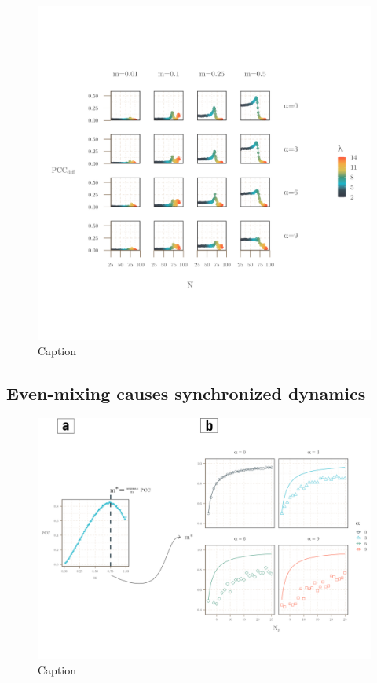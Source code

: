 \documentclass[]{article}
\begin{document}
\begin{figure}[H]
    \centering
    \includegraphics[width=15cm]{figs/abundance_v_alpha.png}
    \caption{Caption}
    \label{fig:mig_grad}
\end{figure}


\subsection{Even-mixing causes synchronized dynamics}


\begin{figure}[H]
    \centering
    \includegraphics[width=15cm]{figs/even_mixing_annotated.png}
    \caption{Caption}
    \label{fig:mig_grad}
\end{figure}
\end{document}

